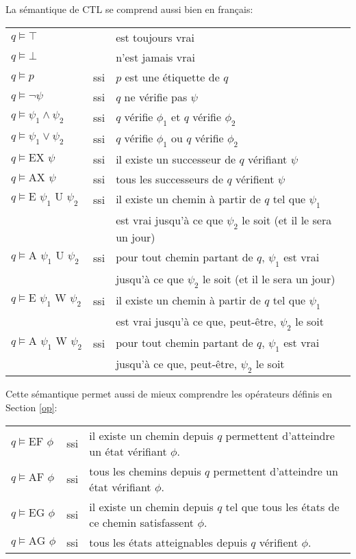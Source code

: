 \documentclass[10pt,a4paper]{article}
\begin{document}
\bigskip

La sémantique de CTL se comprend aussi bien en français:

\begin{tabular}{lcl}
$q \vDash \top$ && est toujours vrai\\
$q \vDash \bot$ && n'est jamais vrai\\
$q \vDash p$ &ssi& $p$ est une étiquette de $q$\\
$q \vDash \neg \psi$ &ssi& $q$ ne vérifie pas $\psi$\\
$q \vDash \psi_1 \land \psi_2$ &ssi& $q$ vérifie $\phi_1$ et $q$ vérifie $\phi_2$\\
$q \vDash \psi_1 \lor \psi_2$ &ssi& $q$ vérifie $\phi_1$ ou $q$ vérifie $\phi_2$\\
$q \vDash \mbox{EX } \psi$ &ssi& il existe un successeur de $q$ vérifiant $\psi$\\
$q \vDash \mbox{AX } \psi$ &ssi& tous les successeurs de $q$ vérifient $\psi$\\
$q \vDash \mbox{E } \psi_1 \mbox{ U } \psi_2$ &ssi& il existe un chemin à partir de $q$ tel que $\psi_1$\\&& est vrai jusqu'à ce que $\psi_2$ le soit (et il le sera un jour)\\

$q \vDash \mbox{A } \psi_1 \mbox{ U } \psi_2$ &ssi& pour tout chemin partant de $q$, $\psi_1$ est vrai \\&& jusqu'à ce que $\psi_2$ le soit (et il le sera un jour)\\

$q \vDash \mbox{E } \psi_1 \mbox{ W } \psi_2$ &ssi& il existe un chemin à partir de $q$ tel que $\psi_1$\\&& est vrai jusqu'à ce que, peut-être, $\psi_2$ le soit\\

$q \vDash \mbox{A } \psi_1 \mbox{ W } \psi_2$ &ssi& pour tout chemin partant de $q$, $\psi_1$ est vrai \\&& jusqu'à ce que, peut-être, $\psi_2$ le soit\\
\end{tabular}

\bigskip
Cette sémantique permet aussi de mieux comprendre les opérateurs définis en Section \ref{op}:

\begin{tabular}{lcl}
$q \vDash \mbox{EF } \phi$ & ssi & il existe un chemin depuis $q$ permettent d'atteindre un état vérifiant $\phi$. \\
$q \vDash \mbox{AF } \phi$ & ssi & tous les chemins depuis $q$ permettent d'atteindre un état vérifiant $\phi$. \\
$q \vDash \mbox{EG } \phi$ & ssi & il existe un chemin depuis $q$ tel que tous les états de ce chemin satisfassent $\phi$.\\
$q \vDash \mbox{AG } \phi$ & ssi & tous les états atteignables depuis $q$ vérifient $\phi$.\\
\end{tabular}
\end{document}
